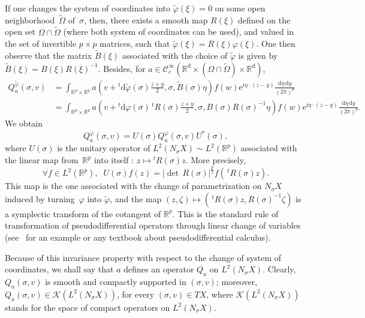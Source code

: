 \documentclass[AHL,Unicode,longabstracts]{cedram}
\DeclareMathOperator{\dett}{det}
\newcommand*\R{{\mathbb R}}
\numberwithin{equation}{section}
\newcommand{\ee}{{\mathrm e}}
\let\oldforall\forall
\renewcommand*{\forall}{\mathrel{\oldforall}}
\newcommand*{\dd}{\mathrm{d}}
\newcommand*{\dy}{\dd y}
\newcommand*{\deta}{\dd \eta}
\newcommand*{\dphi}{\dd \varphi}
\begin{document}

If one changes the system of coordinates into $\widetilde\varphi(\xi)=0$ on some open neighborhood~$\widetilde\Omega$ of~$\sigma$, then, there exists a smooth map $R(\xi)$ defined on the open set $\Omega\cap\widetilde\Omega$ (where both system of coordinates can be used), and valued in the set of invertible $p\times p$ matrices, such that $\widetilde \varphi(\xi)=R(\xi) \varphi(\xi)$. One then observe that the matrix $\widetilde B(\xi)$ associated with the choice of $\widetilde \varphi$ is given by $\widetilde B(\xi)=B(\xi)R(\xi)^{-1}.$ Besides, for $a\in {\mathcal C}^\infty_c(\R^d\times (\Omega\cap \widetilde\Omega) \times \R^d)$,
\begin{align*}
Q_a^{\widetilde \varphi} (\sigma,v)& =
\int_{\R^p\times \R^p}a\left(v+ {}^t\mathrm{d}\widetilde\varphi(\sigma) \frac{z+y}{2},\sigma, \widetilde B(\sigma) \eta\right)f(w){\ee}^{i\eta\cdot (z-y)}\frac{\deta\,\dy}{(2\pi)^p}\\
& = \int_{\R^p\times \R^p}a\left(v+ {}^t\dphi(\sigma) \,^tR(\sigma) \frac{z+y}{2},\sigma, B(\sigma)R(\sigma)^{-1} \eta\right)f(w){\ee}^{i\eta\cdot (z-y)}\frac{\deta\,\dy}{(2\pi)^p}.
\end{align*}
We obtain
\[
Q_a^{\widetilde \varphi} (\sigma,v)= U(\sigma)Q_a^{\varphi}(\sigma,v)U^*(\sigma),
\]
where $U(\sigma)$ is the unitary operator of $L^2(N_\sigma X)\sim L^2(\R^p)$ associated with the linear map from~$\R^p$ into itself : $ z\mapsto {}^tR(\sigma) z$. More precisely,
\[
\forall f\in L^2(\R^p),\;\; U(\sigma) f(z)= \left|{\dett} \,R(\sigma)\right|^\frac{p}{2} f(\,^tR(\sigma)z).
\]
This map is the one associated with the change of parametrization on $N_\sigma X$\linebreak induced by turning~$\varphi$ into $\widetilde\varphi$, and the map $(z,\zeta)\mapsto (\,^tR(\sigma)z,R(\sigma)^{-1}\zeta)$ is a symplectic transform of the cotangent of $\R^p$. This is the standard rule of transformation of pseudodifferential operators through linear change of variables (see~\cite{AlinhacGerard} for an example or any textbook about pseudodifferential calculus).


Because of this invariance property with respect to the change of system of coordinates, we shall say that $a$ defines an operator $Q_a$ on $L^2(N_\sigma X)$. Clearly, $Q_a(\sigma,v)$ is smooth and compactly supported in $(\sigma,v)$; moreover, $Q_a(\sigma,v)\in\mathcal{K}(L^2(N_\sigma X))$, for every $(\sigma,v)\in TX$, where $\mathcal{K}(L^2(N_\sigma X))$ stands for the space of compact operators on $L^2(N_\sigma X)$.
\end{document}
